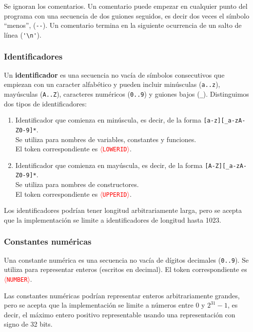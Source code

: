 \documentclass{article}
\newcommand{\tok}[1]{\textcolor{red}{{\texttt{$\langle$#1$\rangle$}}}}
\begin{document}
  Se ignoran los comentarios.
  Un comentario puede empezar en cualquier punto
  del programa con una secuencia de dos guiones seguidos, es decir dos
  veces el símbolo ``menos'', (\verb|--|).
  Un comentario termina en la siguiente ocurrencia de un salto de línea
  (\verb|'\n'|).

\subsubsection*{Identificadores}

  Un {\bf identificador} es una secuencia no vacía de símbolos consecutivos
  que empiezan con un caracter alfabético
  y pueden incluir
  minúsculas (\verb|a..z|),
  mayúsculas (\verb|A..Z|),
  caracteres numéricos (\verb|0..9|)
  y guiones bajos (\verb|_|).
  Distinguimos dos tipos de identificadores:
  \begin{enumerate}
  \item Identificador que comienza en minúscula,
        es decir, de la forma
        \verb|[a-z][_a-zA-Z0-9]*|.\\
        Se utiliza para nombres de variables, constantes y funciones.\\
        El token correspondiente es \tok{LOWERID}.
  \item Identificador que comienza en mayúscula,
        es decir, de la forma
        \verb|[A-Z][_a-zA-Z0-9]*|.\\
        Se utiliza para nombres de constructores.\\
        El token correspondiente es \tok{UPPERID}.
  \end{enumerate}
  Los identificadores podrían tener longitud arbitrariamente larga,
  pero se acepta que la implementación se limite a identificadores de
  longitud hasta 1023.

\subsubsection*{Constantes numéricas}
  Una constante numérica es una secuencia no vacía de dígitos
  decimales (\verb|0..9|).
  Se utiliza para representar enteros (escritos en decimal).
  El token correspondiente es \tok{NUMBER}.

  Las constantes numéricas podrían representar enteros arbitrariamente
  grandes,
  pero se acepta que la implementación se limite a números entre
  0 y $2^{31}-1$, es decir, el máximo entero positivo representable
  usando una representación con signo de 32 bits.
\end{document}

